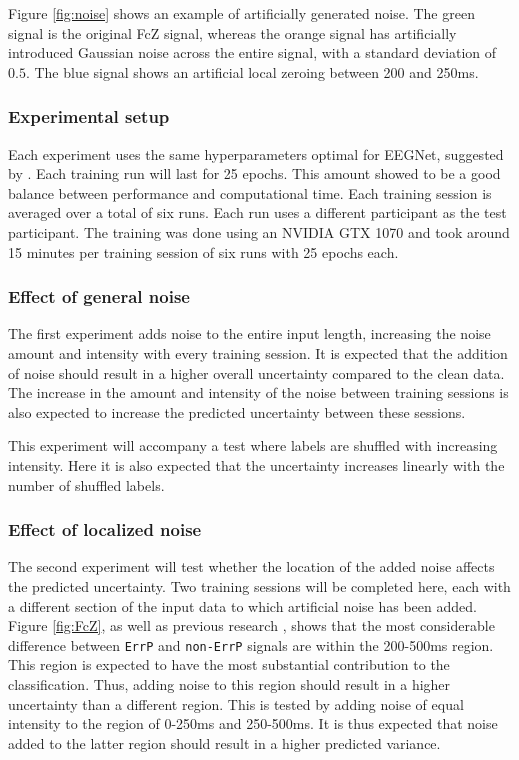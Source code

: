 Figure \ref{fig:noise} shows an example of artificially generated noise. The green signal is the original FcZ signal, whereas the orange signal has artificially introduced Gaussian noise across the entire signal, with a standard deviation of $0.5$. The blue signal shows an artificial local zeroing between 200 and 250ms.

\subsubsection{Experimental setup}

Each experiment uses the same hyperparameters optimal for EEGNet, suggested by \cite{lawhern2018eegnet}. Each training run will last for 25 epochs. This amount showed to be a good balance between performance and computational time. Each training session is averaged over a total of six runs. Each run uses a different participant as the test participant. The training was done using an NVIDIA GTX 1070 and took around 15 minutes per training session of six runs with 25 epochs each.

\subsubsection{Effect of general noise}

The first experiment adds noise to the entire input length, increasing the noise amount and intensity with every training session. It is expected that the addition of noise should result in a higher overall uncertainty compared to the clean data. The increase in the amount and intensity of the noise between training sessions is also expected to increase the predicted uncertainty between these sessions.

This experiment will accompany a test where labels are shuffled with increasing intensity. Here it is also expected that the uncertainty increases linearly with the number of shuffled labels. 

\subsubsection{Effect of localized noise}

The second experiment will test whether the location of the added noise affects the predicted uncertainty. Two training sessions will be completed here, each with a different section of the input data to which artificial noise has been added. Figure \ref{fig:FcZ}, as well as previous research \citep{lopes2021online, omedes2015analysis}, shows that the most considerable difference between \verb|ErrP| and \verb|non-ErrP| signals are within the 200-500ms region. This region is expected to have the most substantial contribution to the classification. Thus, adding noise to this region should result in a higher uncertainty than a different region. This is tested by adding noise of equal intensity to the region of 0-250ms and 250-500ms. It is thus expected that noise added to the latter region should result in a higher predicted variance.

